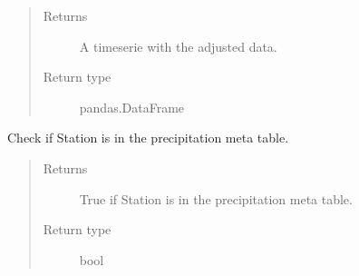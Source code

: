 \documentclass[letterpaper,10pt,english]{sphinxmanual}
\begin{document}
\begin{fulllineitems}
\begin{fulllineitems}
\begin{quote}
\begin{description}
\begin{itemize}
\end{itemize}

\item[{Returns}] \leavevmode
\sphinxAtStartPar
A timeserie with the adjusted data.

\item[{Return type}] \leavevmode
\sphinxAtStartPar
pandas.DataFrame

\end{description}\end{quote}

\end{fulllineitems}


\begin{fulllineitems}
\label{\detokenize{weatherDB:weatherDB.station.StationTETBase.isin_meta_n}}
\sphinxAtStartPar
Check if Station is in the precipitation meta table.
\begin{quote}\begin{description}
\item[{Returns}] \leavevmode
\sphinxAtStartPar
True if Station is in the precipitation meta table.

\item[{Return type}] \leavevmode
\sphinxAtStartPar
bool

\end{description}\end{quote}

\end{fulllineitems}



\end{fulllineitems}
\end{document}
